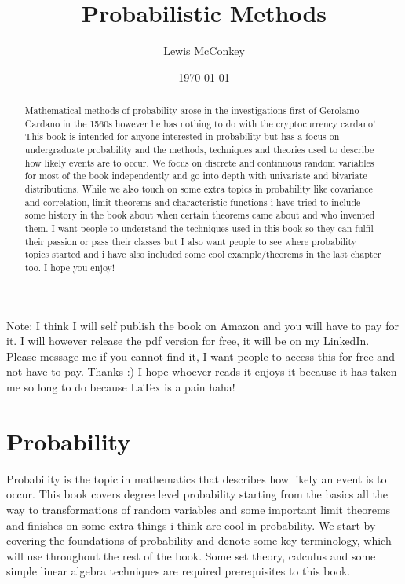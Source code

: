\documentclass[,oneside]{article}
\title{Probabilistic Methods}
\author{Lewis McConkey}
\date{ \today}
\begin{document}
\maketitle
\begin{center}
\end{center}
\begin{center}
\end{center}
\pagebreak
\begin{abstract}
Mathematical methods of probability arose in the investigations first of Gerolamo Cardano in the 1560s however he has nothing to do with the cryptocurrency cardano! This book is intended for anyone interested in probability but has a focus on undergraduate probability and the methods, techniques and theories used to describe how likely events are to occur. We focus on discrete and continuous random variables for most of the book independently and go into depth with univariate and bivariate distributions. While we also touch on some extra topics in probability like covariance and correlation, limit theorems and characteristic functions i have tried to include some history in the book about when certain theorems came about and who invented them. I want people to understand the techniques used in this book so they can fulfil their passion or pass their classes but I also want people to see where probability topics started and i have also included some cool example/theorems in the last chapter too. I hope you enjoy!\\
\end{abstract}
Note: I think I will self publish the book on Amazon and you will have to pay for it. I will however release the pdf version for free, it will be on my LinkedIn. Please message me if you cannot find it, I want people to access this for free and not have to pay. Thanks :) I hope whoever reads it enjoys it because it has taken me so long to do because LaTex is a pain haha!
\pagebreak
\tableofcontents
\pagebreak
\section{Probability}
Probability is the topic in mathematics that describes how likely an event is to occur. This book covers degree level probability starting from the basics all the way to transformations of random variables and some important limit theorems and finishes on some extra things i think are cool in probability. We start by covering the foundations of probability and denote some key terminology, which will use throughout the rest of the book. Some set theory, calculus and some simple linear algebra techniques are required prerequisites to this book.\\
\end{document}
